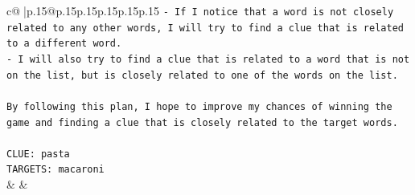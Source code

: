 \documentclass{article}
\begin{document}
{\begin{supertabular}{c@{$\;$}|p{.15\linewidth}@{}p{.15\linewidth}p{.15\linewidth}p{.15\linewidth}p{.15\linewidth}p{.15\linewidth}}
{{{\texttt{{-} If I notice that a word is not closely related to any other words, I will try to find a clue that is related to a different word.} \\
\texttt{{-} I will also try to find a clue that is related to a word that is not on the list, but is closely related to one of the words on the list.} \\
\\ 
\texttt{By following this plan, I hope to improve my chances of winning the game and finding a clue that is closely related to the target words.} \\
\\ 
\texttt{CLUE: pasta} \\
\texttt{TARGETS: macaroni} \\
            }
        }
    }
    & & \\ \\

\end{supertabular}
}
\end{document}
